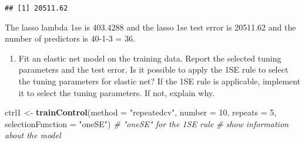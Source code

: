 \documentclass[
]{article}
\newenvironment{Shaded}{\begin{snugshade}}{\end{snugshade}}
\newcommand{\AttributeTok}[1]{\textcolor[rgb]{0.13,0.29,0.53}{#1}}
\newcommand{\CommentTok}[1]{\textcolor[rgb]{0.56,0.35,0.01}{\textit{#1}}}
\newcommand{\DecValTok}[1]{\textcolor[rgb]{0.00,0.00,0.81}{#1}}
\newcommand{\FunctionTok}[1]{\textcolor[rgb]{0.13,0.29,0.53}{\textbf{#1}}}
\newcommand{\NormalTok}[1]{#1}
\newcommand{\OtherTok}[1]{\textcolor[rgb]{0.56,0.35,0.01}{#1}}
\newcommand{\SpecialCharTok}[1]{\textcolor[rgb]{0.81,0.36,0.00}{\textbf{#1}}}
\newcommand{\StringTok}[1]{\textcolor[rgb]{0.31,0.60,0.02}{#1}}
\providecommand{\tightlist}{%
  \setlength{\itemsep}{0pt}\setlength{\parskip}{0pt}}
\begin{document}
\begin{Shaded}
\end{Shaded}

\begin{verbatim}
## [1] 20511.62
\end{verbatim}

The lasso lambda 1se is 403.4288 and the lasso 1se test error is
20511.62 and the number of predictors is 40-1-3 = 36.

\begin{enumerate}
\def\labelenumi{(\alph{enumi})}
\setcounter{enumi}{1}
\tightlist
\item
  Fit an elastic net model on the training data. Report the selected
  tuning parameters and the test error. Is it possible to apply the 1SE
  rule to select the tuning parameters for elastic net? If the 1SE rule
  is applicable, implement it to select the tuning parameters. If not,
  explain why.
\end{enumerate}

\begin{Shaded}
\begin{Highlighting}[]
\NormalTok{ctrl1 }\OtherTok{\textless{}{-}} \FunctionTok{trainControl}\NormalTok{(}\AttributeTok{method =} \StringTok{"repeatedcv"}\NormalTok{,}
\AttributeTok{number =} \DecValTok{10}\NormalTok{,}
\AttributeTok{repeats =} \DecValTok{5}\NormalTok{,}
\AttributeTok{selectionFunction =} \StringTok{"oneSE"}\NormalTok{) }\CommentTok{\# "oneSE" for the 1SE rule}
\CommentTok{\# show information about the model}
\end{Highlighting}
\end{Shaded}
\end{document}
